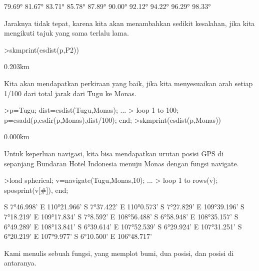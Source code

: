 \documentclass[12pt,Times new roman,letterpaper]{book}
\begin{document}
\begin{eulernootebook}
\begin{eulercomment}
\begin{eulercomment}
\begin{eulernootebook}
\begin{eulercomment}
\begin{eulercomment}
\begin{eulercomment}
\begin{eulercomment}
\begin{eulercomment}
\begin{eulercomment}
\begin{eulernotebook}
\begin{eulercomment}
\begin{eulercomment}
\begin{eulercomment}
\begin{eulercomment}
\begin{eulercomment}
\begin{eulerprompt}
\end{eulerprompt}
\begin{euleroutput}
       79.69°
       81.67°
       83.71°
       85.78°
       87.89°
       90.00°
       92.12°
       94.22°
       96.29°
       98.33°
\end{euleroutput}
\begin{eulercomment}
Jaraknya tidak tepat, karena kita akan menambahkan sedikit kesalahan,
jika kita mengikuti tajuk yang sama terlalu lama.
\end{eulercomment}
\begin{eulerprompt}
>skmprint(esdist(p,P2))
\end{eulerprompt}
\begin{euleroutput}
       0.203km
\end{euleroutput}
\begin{eulercomment}
Kita akan mendapatkan perkiraan yang baik, jika kita menyesuaikan arah
setiap 1/100 dari total jarak dari Tugu ke Monas.
\end{eulercomment}
\begin{eulerprompt}
>p=Tugu; dist=esdist(Tugu,Monas); ...
>  loop 1 to 100; p=esadd(p,esdir(p,Monas),dist/100); end;
>skmprint(esdist(p,Monas))
\end{eulerprompt}
\begin{euleroutput}
       0.000km
\end{euleroutput}
\begin{eulercomment}
Untuk keperluan navigasi, kita bisa mendapatkan urutan posisi GPS di
sepanjang Bundaran Hotel Indonesia menuju Monas dengan fungsi
navigate.
\end{eulercomment}
\begin{eulerprompt}
>load spherical; v=navigate(Tugu,Monas,10); ...
>  loop 1 to rows(v); sposprint(v[#]), end;
\end{eulerprompt}
\begin{euleroutput}
  S 7°46.998' E 110°21.966'
  S 7°37.422' E 110°0.573'
  S 7°27.829' E 109°39.196'
  S 7°18.219' E 109°17.834'
  S 7°8.592' E 108°56.488'
  S 6°58.948' E 108°35.157'
  S 6°49.289' E 108°13.841'
  S 6°39.614' E 107°52.539'
  S 6°29.924' E 107°31.251'
  S 6°20.219' E 107°9.977'
  S 6°10.500' E 106°48.717'
\end{euleroutput}
\begin{eulercomment}
Kami menulis sebuah fungsi, yang memplot bumi, dua posisi, dan posisi
di antaranya.
\end{eulercomment}
\begin{eulerprompt}

\end{eulerprompt}
\end{eulercomment}
\end{eulercomment}
\end{eulercomment}
\end{eulercomment}
\end{eulercomment}
\end{eulernotebook}
\end{eulercomment}
\end{eulercomment}
\end{eulercomment}
\end{eulercomment}
\end{eulercomment}
\end{eulercomment}
\end{eulernootebook}
\end{eulercomment}
\end{eulercomment}
\end{eulernootebook}
\end{document}
